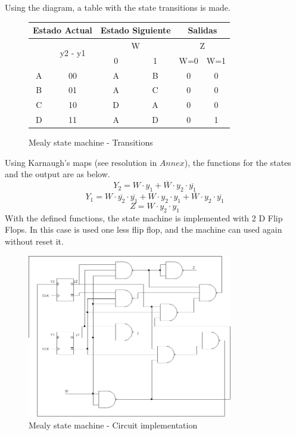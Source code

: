 Using the diagram, a table with the state 
transitions is made.
\begin{figure}[H]
    \begin{center}
\begin{tabular}{|c|c|c|c||c|c|}
    \hline 
    \multicolumn{2}{|c|}{Estado Actual} & \multicolumn{2}{c||}{Estado Siguiente} & \multicolumn{2}{c|}{Salidas}\tabularnewline
    \hline 
    \hline 
    \multirow{2}{*}{} & \multirow{2}{*}{y2 - y1} & \multicolumn{2}{c||}{W} & \multicolumn{2}{c|}{Z}\tabularnewline
    \cline{3-6} 
     &  & \multicolumn{1}{c|}{0} & \multicolumn{1}{c||}{1} & W=0 & W=1\tabularnewline
    \hline 
    A & 00 & A & B & 0 & 0\tabularnewline
    \hline 
    B & 01 & A & C & 0 & 0\tabularnewline
    \hline 
    C & 10 & D & A & 0 & 0\tabularnewline
    \hline 
    D & 11 & A & D & 0 & 1\tabularnewline
    \hline 
    \end{tabular}
    \caption{Mealy state machine - Transitions}
\end{center}
\end{figure}

Using Karnaugh's maps (see resolution in $Annex$), the functions for the 
states and the output are as below.
$$Y_2 = W \cdot y_1 + \overline{W} \cdot y_2 \cdot \overline{y_1}$$ 
$$Y_1 = W \cdot \overline{y_2} \cdot \overline{y_1} + W \cdot y_2 \cdot y_1 + \overline{W} \cdot y_2 \cdot \overline{y_1}$$
$$Z = W \cdot y_2 \cdot y_1$$
With the defined functions, the state machine 
is implemented with 2 D Flip Flops. In this case
is used one less flip flop, and the machine can
used again without reset it.

\begin{figure}[H]
    \begin{centering}
    \includegraphics[width=0.8\textwidth]{data/Graficos2/2b_Compuertas_Mealy.png}
    \par\end{centering}
    \caption{Mealy state machine - Circuit implementation}
\end{figure}


